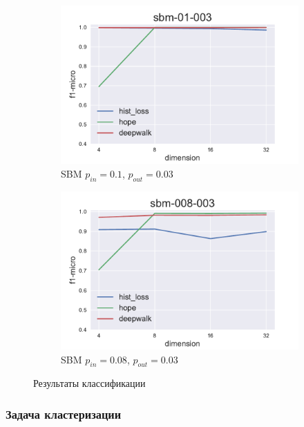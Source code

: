 \documentclass[12pt,a4paper]{extarticle}
\begin{document}
\begin{figure}
\begin{subfigure}{.5\linewidth}
    \includegraphics[width=\linewidth]{src/images/Node_classification_sbm-01-003.pdf}
    \caption{SBM $p_{in}=0.1$, $p_{out}=0.03$}
    \label{fig:clas_sbm2}
    \end{subfigure}
    \begin{subfigure}{.5\linewidth}
    \centering
    \includegraphics[width=\linewidth]{src/images/Node_classification_sbm-008-003.pdf}
    \caption{SBM $p_{in}=0.08$, $p_{out}=0.03$}
    \label{fig:clas_sbm3}
    \end{subfigure}
    \caption{Результаты классификации}
    \label{fig:clas}
    \end{figure}
    
    \subsubsection{Задача кластеризации}
\end{document}
